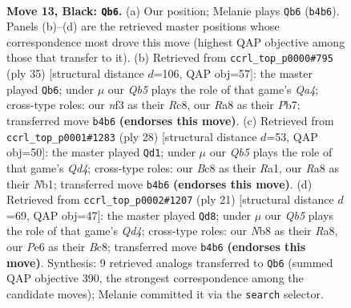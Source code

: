\documentclass[11pt]{article}
\begin{document}
\clearpage

\begin{figure}[p]\centering
\begin{subfigure}{0.46\textwidth}\centering
\resizebox{\linewidth}{!}{%
\newchessgame
\chessboard[
  setfen={rnb2rk1/pp3ppp/4p3/8/1qB1P1nP/5N2/PP1N2P1/R2QK2R b KQ - 0 13},
  showmover=false,
  pgfstyle=straightmove, color=movearrow, markmove={b4-b6}
]}
\caption{}
\end{subfigure}\hfill
\begin{subfigure}{0.46\textwidth}\centering
\resizebox{\linewidth}{!}{%
\newchessgame
\chessboard[
  setfen={2rr3k/pp2bppp/3p1n2/q3n3/4PB2/P1N5/1PP1N1PP/1K1RQR2 b - - 0 18},
  showmover=false,
  pgfstyle=straightmove, color=movearrow, markmove={a5-b6}
]}
\caption{}
\end{subfigure}
\\[4pt]
\begin{subfigure}{0.46\textwidth}\centering
\resizebox{\linewidth}{!}{%
\newchessgame
\chessboard[
  setfen={r2qk2r/3n1ppp/p3pn2/2b5/3Q1P2/4P2P/1P2BP2/RNB2RK1 w kq - 1 15},
  showmover=false,
  pgfstyle=straightmove, color=movearrow, markmove={d4-d1}
]}
\caption{}
\end{subfigure}\hfill
\begin{subfigure}{0.46\textwidth}\centering
\resizebox{\linewidth}{!}{%
\newchessgame
\chessboard[
  setfen={r1b1kb1r/pp3p1p/2n5/3qpp2/2B5/4PN2/PP1N1PPP/R2QK2R b KQkq - 1 11},
  showmover=false,
  pgfstyle=straightmove, color=movearrow, markmove={d5-d8}
]}
\caption{}
\end{subfigure}
\caption{\textbf{Move 13, Black: \texttt{Qb6}.} (a) Our position; Melanie plays \texttt{Qb6} (\texttt{b4b6}). Panels (b)--(d) are the retrieved master positions whose correspondence most drove this move (highest QAP objective among those that transfer to it). (b) Retrieved from \texttt{ccrl\_top\_p0000\#795} (ply 35) [structural distance $d$=106, QAP obj=57]: the master played \texttt{Qb6}; under $\mu$ our \emph{Qb5} plays the role of that game's \emph{Qa4}; cross-type roles: our \emph{n}f3 as their \emph{R}c8, our \emph{R}a8 as their \emph{P}b7; transferred move \texttt{b4b6} \textbf{(endorses this move)}. (c) Retrieved from \texttt{ccrl\_top\_p0001\#1283} (ply 28) [structural distance $d$=53, QAP obj=50]: the master played \texttt{Qd1}; under $\mu$ our \emph{Qb5} plays the role of that game's \emph{Qd4}; cross-type roles: our \emph{B}c8 as their \emph{R}a1, our \emph{R}a8 as their \emph{N}b1; transferred move \texttt{b4b6} \textbf{(endorses this move)}. (d) Retrieved from \texttt{ccrl\_top\_p0002\#1207} (ply 21) [structural distance $d$=69, QAP obj=47]: the master played \texttt{Qd8}; under $\mu$ our \emph{Qb5} plays the role of that game's \emph{Qd4}; cross-type roles: our \emph{N}b8 as their \emph{R}a8, our \emph{P}e6 as their \emph{B}c8; transferred move \texttt{b4b6} \textbf{(endorses this move)}. Synthesis: 9 retrieved analogs transferred to \texttt{Qb6} (summed QAP objective 390, the strongest correspondence among the candidate moves); Melanie committed it via the \texttt{search} selector.}
\label{fig:thought-m25}
\end{figure}
\end{document}

